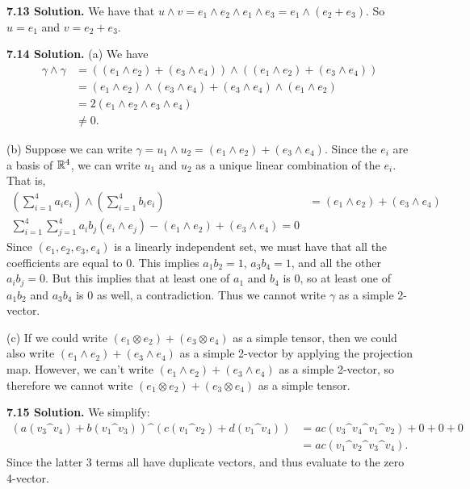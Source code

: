 \textbf{7.13 Solution.} We have that $u \wedge v = e_1 \wedge e_2 \wedge e_1 \wedge e_3 = e_1 \wedge (e_2 + e_3)$. So $u = e_1$ and $v = e_2 + e_3$.

\textbf{7.14 Solution.} (a) We have
\begin{align*}
    \gamma \wedge \gamma &= ((e_1 \wedge e_2) + (e_3 \wedge e_4)) \wedge ((e_1 \wedge e_2) + (e_3 \wedge e_4)) \\
    &= (e_1 \wedge e_2) \wedge (e_3 \wedge e_4) + (e_3 \wedge e_4) \wedge (e_1 \wedge e_2) \\
    &= 2(e_1 \wedge e_2 \wedge e_3 \wedge e_4) \\
    &\neq 0.
\end{align*}

(b) Suppose we can write $\gamma = u_1 \wedge u_2 = (e_1 \wedge e_2) + (e_3 \wedge e_4)$. Since the $e_i$ are a basis of $\mathbb{R}^4$, we can write $u_1$ and $u_2$ as a unique linear combination of the $e_i$. That is,
\begin{align*}
    \left(\sum\limits_{i = 1}^4 a_ie_i\right) \wedge \left(\sum\limits_{i = 1}^4 b_ie_i\right) &= (e_1 \wedge e_2) + (e_3 \wedge e_4) \\
    \sum\limits_{i = 1}^4\sum\limits_{j = 1}^4 a_ib_j(e_i \wedge e_j) - (e_1 \wedge e_2) + (e_3 \wedge e_4) = 0
\end{align*}
Since $(e_1, e_2, e_3, e_4)$ is a linearly independent set, we must have that all the coefficients are equal to 0. This implies $a_1b_2 = 1$, $a_3b_4 = 1$, and all the other $a_ib_j = 0$. But this implies that at least one of $a_1$ and $b_4$ is 0, so at least one of $a_1b_2$ and $a_3b_4$ is 0 as well, a contradiction. Thus we cannot write $\gamma$ as a simple 2-vector.

(c) If we could write $(e_1 \otimes e_2) + (e_3 \otimes e_4)$ as a simple tensor, then we could also write $(e_1 \wedge e_2) + (e_3 \wedge e_4)$ as a simple 2-vector by applying the projection map. However, we can't write $(e_1 \wedge e_2) + (e_3 \wedge e_4)$ as a simple 2-vector, so therefore we cannot write $(e_1 \otimes e_2) + (e_3 \otimes e_4)$ as a simple tensor.

\textbf{7.15 Solution.} We simplify:
\begin{align*}
    (a(v_3 \^ v_4) + b(v_1 \^ v_3)) \^ (c(v_1 \^ v_2) + d(v_1 \^ v_4)) &= ac(v_3 \^ v_4 \^ v_1 \^ v_2) + 0 + 0 + 0 \\
    &= ac(v_1 \^ v_2 \^ v_3 \^ v_4).
\end{align*}
Since the latter 3 terms all have duplicate vectors, and thus evaluate to the zero 4-vector.

